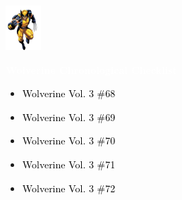 \documentclass[12pt]{article}
\newcommand{\checkbox}{\raisebox{0.0ex}{\fbox{\rule{0ex}{1.5ex} \rule{1.5ex}{0ex}}}}
\begin{document}
\newpage
{}
\begin{center}
    \vspace*{2cm}
    \includegraphics[width=0.1\textwidth]{wolverine.png}
    \vspace{0.3cm}

    {\Huge \textbf{\textcolor{white}{Wolverine Chronological Checklist}}}
\end{center}
\vspace{0.3cm}
\noindent
\begin{tcolorbox}[
  colback=white!95!gray, colframe=black,
  width=\textwidth, arc=4mm, auto outer arc,
  boxrule=0.8pt,
  left=8pt,right=8pt,top=8pt,bottom=8pt
]
\begin{itemize}[left=0pt,label={\checkbox}]
  \item \textcolor{black}{Wolverine Vol. 3 \#68}
  \item \textcolor{black}{Wolverine Vol. 3 \#69}
  \item \textcolor{black}{Wolverine Vol. 3 \#70}
  \item \textcolor{black}{Wolverine Vol. 3 \#71}
  \item \textcolor{black}{Wolverine Vol. 3 \#72}
\end{itemize}
\end{tcolorbox}
\end{document}
